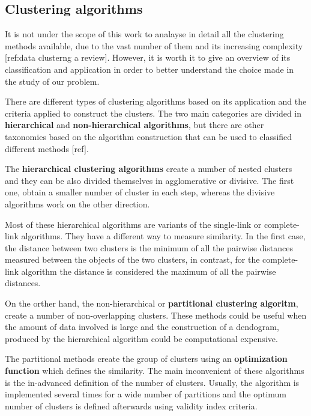 \subsection{Clustering algorithms}

It is not under the scope of this work to analayse in detail all the clustering methods available, due to the vast number of them and its increasing complexity [ref:data clusterng a review]. However, it is worth it to give an overview of its classification and application in order to better understand the choice made in the study of our problem.

There are different types of clustering algorithms based on its application and the criteria applied to construct the clusters. The two main categories are divided in \textbf{hierarchical} and \textbf{non-hierarchical algorithms}, but there are other taxonomies based on the algorithm construction that can be used to classified different methods [ref].

The \textbf{hierarchical clustering algorithms} create a number of nested clusters and they can be also divided themselves in agglomerative or divisive. The first one, obtain a smaller number of cluster in each step, whereas the divisive algorithms work on the other direction.

Most of these hierarchical algorithms are variants of the single-link or complete-link algorithms. They have a different way to measure similarity. In the first case, the distance between two clusters is the minimum of all the pairwise distances measured between the objects of the two clusters, in contrast, for the complete-link algorithm the distance is considered the maximum of all the pairwise distances.

On the orther hand, the non-hierarchical or \textbf{partitional clustering algoritm}, create a number of non-overlapping clusters. These methods could be useful when the amount of data involved is large and the construction of a dendogram, produced by the hierarchical algorithm could be computational expensive.

The partitional methods create the group of clusters using an \textbf{optimization function} which defines the similarity. The main inconvenient of these algorithms is the in-advanced definition of the number of clusters. Usually, the algorithm is implemented several times for a wide number of partitions and the optimum number of clusters is defined afterwards using validity index criteria.



